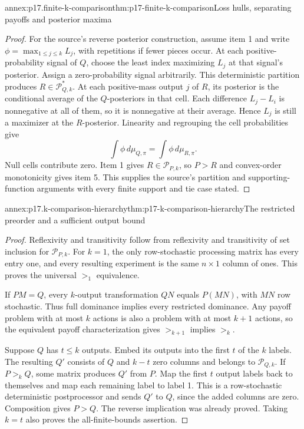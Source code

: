 \begin{annexitem}{annex:p17.finite-k-comparison}{thm:p17-finite-k-comparison}{Loss hulls, separating payoffs and posterior maxima}
\begin{proof}
For the source's reverse posterior construction, assume item 1 and write
\(\phi=\max_{1\leq j\leq k}L_j\), with repetitions if fewer pieces occur.
At each positive-probability signal of \(Q\), choose the least index
maximizing \(L_j\) at that signal's posterior. Assign a zero-probability
signal arbitrarily. This deterministic partition produces
\(R\in\mathcal P^*_{Q,k}\).
At each positive-mass output \(j\) of \(R\), its posterior is the
conditional average of the \(Q\)-posteriors in that cell.
Each difference \(L_j-L_i\) is nonnegative at all of them, so it is
nonnegative at their average. Hence \(L_j\) is still a maximizer at
the \(R\)-posterior. Linearity and regrouping the cell probabilities give
\[
                       \int\phi\,d\mu_{Q,\pi}
                              =\int\phi\,d\mu_{R,\pi}.
\]
Null cells contribute zero. Item 1 gives \(R\in\mathcal P_{P,k}\),
so \(P>R\) and convex-order monotonicity gives item 5.
This supplies the source's partition and supporting-function arguments
with every finite support and tie case stated.
\end{proof}
\end{annexitem}

\begin{annexitem}{annex:p17.k-comparison-hierarchy}{thm:p17-k-comparison-hierarchy}{The restricted preorder and a sufficient output bound}
\begin{proof}
Reflexivity and transitivity follow from reflexivity and transitivity
of set inclusion for \(\mathcal P_{P,k}\). For \(k=1\), the only
row-stochastic processing matrix has every entry one, and every resulting
experiment is the same \(n\times1\) column of ones. This proves the
universal \(>_1\) equivalence.

If \(PM=Q\), every \(k\)-output transformation \(QN\) equals \(P(MN)\),
with \(MN\) row stochastic. Thus full dominance implies every restricted
dominance. Any payoff problem with at most \(k\) actions is also a problem
with at most \(k+1\) actions, so the equivalent payoff characterization
gives \(>_{k+1}\) implies \(>_k\).

Suppose \(Q\) has \(t\leq k\) outputs. Embed its outputs into the first
\(t\) of the \(k\) labels. The resulting \(Q'\) consists of \(Q\) and
\(k-t\) zero columns and belongs to \(\mathcal P_{Q,k}\).
If \(P>_kQ\), some matrix produces \(Q'\) from \(P\).
Map the first \(t\) output labels back to themselves and map each
remaining label to label 1. This is a row-stochastic deterministic
postprocessor and sends \(Q'\) to \(Q\), since the added columns are zero.
Composition gives \(P>Q\). The reverse implication was already proved.
Taking \(k=t\) also proves the all-finite-bounds assertion.
\end{proof}
\end{annexitem}

